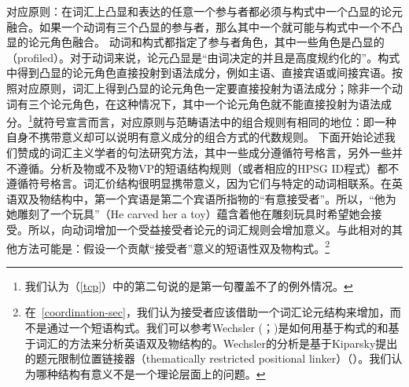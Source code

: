 \ea
对应原则：在词汇上凸显和表达的任意一个参与者都必须与构式中一个凸显的论元融合。如果一个动词有三个凸显的参与者，那么其中一个就可能与构式中一个不凸显的论元角色融合。 \citep[]{Goldberg95a}\label{tcp}
\z
动词和构式都指定了参与者角色，其中一些角色是凸显的（profiled）。对于动词来说，论元凸显是“由词决定的并且是高度规约化的”\citep[]{Goldberg95a}。构式中得到凸显的论元角色直接投射到语法成分，例如主语、直接宾语或间接宾语。按照对应原则，词汇上得到凸显的论元角色一定要直接投射为语法成分；除非一个动词有三个论元角色，在这种情况下，其中一个论元角色就不能直接投射为语法成分。\footnote{我们认为（\ref{tcp}）中的第二句说的是第一句覆盖不了的例外情况。}就符号宣言而言，对应原则与范畴语法中的组合规则有相同的地位：即一种自身不携带意义却可以说明有意义成分的组合方式的代数规则。
    下面开始论述我们赞成的词汇主义学者的句法研究方法，其中一些成分遵循符号格言，另外一些并不遵循。分析及物或不及物VP的短语结构规则（或者相应的HPSG ID程式）都不遵循符号格言。词汇价结构很明显携带意义，因为它们与特定的动词相联系。在英语双及物结构中，第一个宾语是第二个宾语所指物的“有意接受者”。所以，“他为她雕刻了一个玩具”（He carved her a toy）蕴含着他在雕刻玩具时希望她会接受。所以，向动词增加一个受益接受者论元的词汇规则会增加意义。与此相对的其他方法可能是：假设一个贡献“接受者”意义的短语性双及物构式。\footnote{%
在~\ref{coordination-sec}，我们认为接受者应该借助一个词汇论元结构来增加，而不是通过一个短语构式。我们可以参考Wechsler (\citeyear[--113]{Wechsler91a-u}；\citeyear[--89]{Wechsler95a-u})是如何用基于构式的和基于词汇的方法来分析英语双及物结构的。Wechsler的分析是基于Kiparsky提出的题元限制位置链接器（thematically restricted positional linker）（\citeyear{Kiparsky87a-u, Kiparsky88a-u}）。我们认为哪种结构有意义不是一个理论层面上的问题。
}
